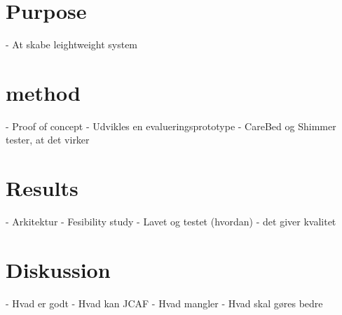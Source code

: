 \documentclass[jou]{apa6}
\begin{document}
\section{Purpose}
- At skabe leightweight system

\section{method}
- Proof of concept
- Udvikles en evalueringsprototype
	- CareBed og Shimmer tester, at det virker

\section{Results}
- Arkitektur
- Fesibility study
	- Lavet og testet (hvordan) - det giver kvalitet

\section{Diskussion}
- Hvad er godt
- Hvad kan JCAF
- Hvad mangler
- Hvad skal gøres bedre



% 




% 
% 
% 
% 
% 


% 
% 

% 
\end{document}

